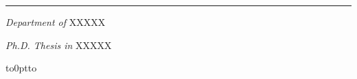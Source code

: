 \begin{titlepage}
  \makeatletter
  \begin{center}
  \vspace*{-1cm}
    \noindent\rule{\textwidth}{0.5pt}
    \begin{large}
      \textit{Department of } \textsc{XXXXX}\\[0.05cm]
    \end{large}
    \begin{normalsize}
      \textit{Ph.D. Thesis in } \textsc{XXXXX}\\[1.2cm]
    \end{normalsize}
    
    \vspace{4cm}


    \vspace*{-4cm}  
    \vbox to0pt{\vbox to\vss}
    \vspace*{5cm}
    \begin{Huge}
      \@title\\
      \end{Huge}  
    \end{center}

    \vspace*{5cm}
    \begin{normalsize}
      \noindent
      \makebox[\textwidth][c]{ }%
      \\[0cm]
	  \end{normalsize} 
    \begin{large}
      \noindent
      \makebox[0pt][l]{\@author}%
      \makebox[\textwidth][c]{ }%
      \\[0cm]
    \end{large}
    \begin{normalsize}
      \noindent
      \makebox[0pt][l]{}%
      \makebox[\textwidth][c]{ }%
  		\\[.3cm]
    \end{normalsize}
    \begin{normalsize}
      \noindent
      \makebox[0pt][l]{\textit{}}%
      \makebox[\textwidth][c]{ }%
      \\[0cm]
	  \end{normalsize} 
    \begin{large}
      \noindent
      \makebox[0pt][l]{}%
      \makebox[\textwidth][c]{ }%
      \\[0cm]
    \end{large}
    \begin{normalsize}
      \noindent
      \makebox[0pt][l]{}%
      \makebox[\textwidth][c]{ }%
      \\[0cm]
    \end{normalsize}
	\begin{center}
  

\end{center}
\end{titlepage}
